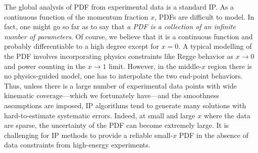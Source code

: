 \documentclass[prd,twocolumn,superscriptaddress,preprintnumbers,showpacs,nofootinbib,notitlepage,floatfix]{revtex4-2}
\begin{document}
The global analysis of PDF from experimental data is a standard IP. As a continuous function of the momentum fraction $x$, PDFs are difficult to model. In fact, one might go so far as to say that {\it a PDF is a collection of an infinite number of parameters}. Of course, we believe that it is a continuous function and probably differentiable to a high degree except for $x=0$. A typical modelling of the PDF involves incorporating physics constraints like Regge behavior as $x\to0$ and power counting in the $x\to1$ limit. However, in the middle-$x$ region there is no physics-guided model, one has to interpolate the two end-point behaviors. Thus, unless there is a large number of experimental data points with wide kinematic coverage---which we fortunately have---and the smoothness assumptions are imposed, IP algorithms tend to generate many solutions with hard-to-estimate systematic errors. Indeed, at small and large $x$ where the data are sparse, the uncertainty of the PDF can become extremely large. It is challenging for IP methods to provide a reliable small-$x$ PDF in the absence of data constraints from high-energy experiments.
\end{document}
